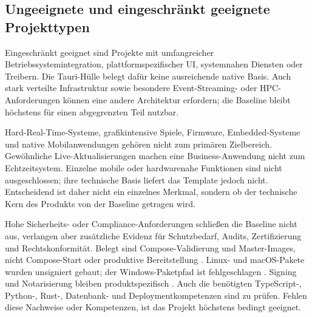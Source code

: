 \subsection{Ungeeignete und eingeschränkt geeignete Projekttypen}
\label{subsec:ungeeignete-projekttypen}

Eingeschränkt geeignet sind Projekte mit umfangreicher Betriebssystemintegration,
plattformspezifischer UI, systemnahen Diensten oder Treibern. Die Tauri-Hülle
belegt dafür keine ausreichende native Basis. Auch stark verteilte
Infrastruktur sowie besondere Event-Streaming- oder HPC-Anforderungen können
eine andere Architektur erfordern; die Baseline bleibt höchstens für einen
abgegrenzten Teil nutzbar.

Hard-Real-Time-Systeme, grafikintensive Spiele, Firmware, Embedded-Systeme und
native Mobilanwendungen gehören nicht zum primären Zielbereich. Gewöhnliche
Live-Aktualisierungen machen eine Business-Anwendung nicht zum
Echtzeitsystem. Einzelne mobile oder hardwarenahe Funktionen sind nicht
ausgeschlossen; ihre technische Basis liefert das Template jedoch nicht.
Entscheidend ist daher nicht ein einzelnes Merkmal, sondern ob der technische
Kern des Produkts von der Baseline getragen wird.

Hohe Sicherheits- oder Compliance-Anforderungen schließen die Baseline nicht
aus, verlangen aber zusätzliche Evidenz für Schutzbedarf, Audits,
Zertifizierung und Rechtskonformität. Belegt sind Compose-Validierung und
Master-Images, nicht Compose-Start oder produktive Bereitstellung
\parencite{kleiveist2026ci-core-run}. Linux- und macOS-Pakete wurden
unsigniert gebaut; der Windows-Paketpfad ist fehlgeschlagen
\parencite{kleiveist2026ci-desktop-run}. Signing und Notarisierung bleiben
produktspezifisch \parencite{kleiveist2026release}. Auch die benötigten
TypeScript-, Python-, Rust-, Datenbank- und Deploymentkompetenzen sind zu
prüfen.
Fehlen diese Nachweise oder Kompetenzen, ist das Projekt höchstens bedingt
geeignet.
